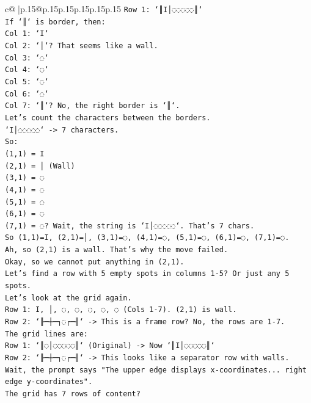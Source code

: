 \documentclass{article}
\begin{document}
{\begin{supertabular}{c@{$\;$}|p{.15\linewidth}@{}p{.15\linewidth}p{.15\linewidth}p{.15\linewidth}p{.15\linewidth}p{.15\linewidth}}
{{{\texttt{Row 1: `║I│◌◌◌◌◌║`} \\
\texttt{If `║` is border, then:} \\
\texttt{Col 1: `I`} \\
\texttt{Col 2: `│`? That seems like a wall.} \\
\texttt{Col 3: `◌`} \\
\texttt{Col 4: `◌`} \\
\texttt{Col 5: `◌`} \\
\texttt{Col 6: `◌`} \\
\texttt{Col 7: `║`? No, the right border is `║`.} \\
\texttt{Let's count the characters between the borders.} \\
\texttt{`I│◌◌◌◌◌` {-}> 7 characters.} \\
\texttt{So:} \\
\texttt{(1,1) = I} \\
\texttt{(2,1) = │ (Wall)} \\
\texttt{(3,1) = ◌} \\
\texttt{(4,1) = ◌} \\
\texttt{(5,1) = ◌} \\
\texttt{(6,1) = ◌} \\
\texttt{(7,1) = ◌? Wait, the string is `I│◌◌◌◌◌`. That's 7 chars.} \\
\texttt{So (1,1)=I, (2,1)=│, (3,1)=◌, (4,1)=◌, (5,1)=◌, (6,1)=◌, (7,1)=◌.} \\
\texttt{Ah, so (2,1) is a wall. That's why the move failed.} \\
\texttt{Okay, so we cannot put anything in (2,1).} \\
\texttt{Let's find a row with 5 empty spots in columns 1{-}5? Or just any 5 spots.} \\
\texttt{Let's look at the grid again.} \\
\texttt{Row 1: I, │, ◌, ◌, ◌, ◌, ◌ (Cols 1{-}7). (2,1) is wall.} \\
\texttt{Row 2: `╟─┼─┐◌┌─╢` {-}> This is a frame row? No, the rows are 1{-}7.} \\
\texttt{The grid lines are:} \\
\texttt{Row 1: `║◌│◌◌◌◌◌║` (Original) {-}> Now `║I│◌◌◌◌◌║`} \\
\texttt{Row 2: `╟─┼─┐◌┌─╢` {-}> This looks like a separator row with walls.} \\
\texttt{Wait, the prompt says "The upper edge displays x{-}coordinates... right edge y{-}coordinates".} \\
\texttt{The grid has 7 rows of content?} \\
}}}
\end{supertabular}}
\end{document}

